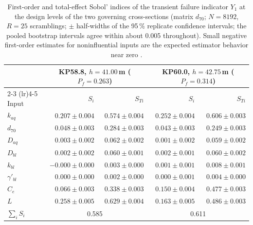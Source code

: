 \begin{table}[htbp]
  \centering
  \caption[Sobol' indices of the transient failure indicator at the design
    levels]{First-order and total-effect Sobol' indices of the transient
    failure indicator $Y_1$ at the design levels of the two governing
    cross-sections (matrix $d_{70}$; $N = 8192$, $R = 25$ scramblings;
    $\pm$ half-widths of the 95\,\% replicate confidence intervals; the
    pooled bootstrap intervals agree within about 0.005 throughout).
    Small negative first-order estimates for noninfluential inputs are the
    expected estimator behavior near zero
    \parencite[p.~170]{saltelli_primer_2008}.}
  \label{tab:gsa_design_indices}
  \begin{tabular}{l rr rr}
    \toprule
    & \multicolumn{2}{c}{KP58.8, $h = 41.00$\,m ($P_f = 0.263$)}
    & \multicolumn{2}{c}{KP60.0, $h = 42.75$\,m ($P_f = 0.314$)} \\
    \cmidrule(lr){2-3} \cmidrule(lr){4-5}
    Input & $S_i$ & $S_{Ti}$ & $S_i$ & $S_{Ti}$ \\
    \midrule
    $k_{aq}$        & $0.207 \pm 0.004$ & $0.574 \pm 0.004$
                    & $0.252 \pm 0.004$ & $0.606 \pm 0.003$ \\
    $d_{70}$        & $0.048 \pm 0.003$ & $0.284 \pm 0.003$
                    & $0.043 \pm 0.003$ & $0.249 \pm 0.003$ \\
    $D_{aq}$        & $0.003 \pm 0.002$ & $0.062 \pm 0.002$
                    & $0.001 \pm 0.002$ & $0.059 \pm 0.002$ \\
    $D_{bl}$        & $0.002 \pm 0.002$ & $0.060 \pm 0.001$
                    & $0.002 \pm 0.001$ & $0.060 \pm 0.002$ \\
    $k_{bl}$        & $-0.000 \pm 0.000$ & $0.003 \pm 0.000$
                    & $0.001 \pm 0.001$ & $0.008 \pm 0.001$ \\
    $\gamma'_{bl}$  & $0.000 \pm 0.000$ & $0.002 \pm 0.000$
                    & $0.000 \pm 0.001$ & $0.004 \pm 0.000$ \\
    $C_e$           & $0.066 \pm 0.003$ & $0.338 \pm 0.003$
                    & $0.150 \pm 0.004$ & $0.477 \pm 0.003$ \\
    $L$             & $0.258 \pm 0.005$ & $0.629 \pm 0.004$
                    & $0.163 \pm 0.005$ & $0.486 \pm 0.003$ \\
    \midrule
    $\sum_i S_i$    & \multicolumn{2}{c}{0.585}
                    & \multicolumn{2}{c}{0.611} \\
    \bottomrule
  \end{tabular}
\end{table}

